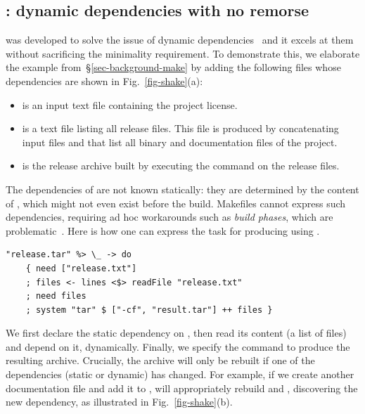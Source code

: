 \subsection{\Shake: dynamic dependencies with no remorse}
\label{sec-background-shake}

\Shake was developed to solve the issue of dynamic
dependencies~\cite{mitchell2012shake} and it excels at them without sacrificing
the minimality requirement. To demonstrate this, we elaborate the \Make example
from~\S\ref{sec-background-make} by adding the following files whose
dependencies are shown in Fig.~\ref{fig-shake}(a):

\begin{itemize}
    \item {} is an input text file containing the project license.
    \item {} is a text file listing all release files. This file
    is produced by concatenating input files  and 
    that list all binary and documentation files of the project.
    \item {} is the release archive built by executing the
    command  on the release files.
\end{itemize}

The dependencies of  are not known statically: they are
determined by the content of , which might not even exist
before the build. Makefiles cannot express such dependencies, requiring ad hoc
workarounds such as \emph{build phases}, which are problematic~\cite{hadrian}.
Here is how one can express the task for producing  using \Shake.

\vspace{1mm}
\begin{verbatim}
"release.tar" %> \_ -> do
    { need ["release.txt"]
    ; files <- lines <$> readFile "release.txt"
    ; need files
    ; system "tar" $ ["-cf", "result.tar"] ++ files }
\end{verbatim}
\vspace{1mm}

\noindent
We first declare the static dependency on , then read its
content (a list of files) and depend on it, dynamically. Finally, we specify the
command to produce the resulting archive. Crucially, the archive will only be
rebuilt if one of the dependencies (static or dynamic) has changed. For example,
if we create another documentation file  and add it to
, \Shake will appropriately rebuild  and
, discovering the new dependency, as illustrated in
Fig.~\ref{fig-shake}(b).

